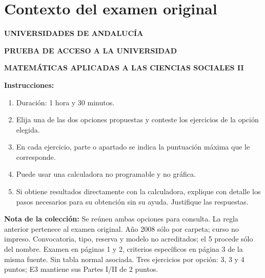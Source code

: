 \section*{Contexto del examen original}
\textbf{UNIVERSIDADES DE ANDALUCÍA}\par
\textbf{PRUEBA DE ACCESO A LA UNIVERSIDAD}\par
\textbf{MATEMÁTICAS APLICADAS A LAS CIENCIAS SOCIALES II}

\textbf{Instrucciones:}
\begin{enumerate}[label=\textbf{\alph*)}]
  \item Duración: 1 hora y 30 minutos.
  \item Elija una de las dos opciones propuestas y conteste los ejercicios de la opción elegida.
  \item En cada ejercicio, parte o apartado se indica la puntuación máxima que le corresponde.
  \item Puede usar una calculadora no programable y no gráfica.
  \item Si obtiene resultados directamente con la calculadora, explique con detalle los pasos necesarios para su obtención sin su ayuda. Justifique las respuestas.
\end{enumerate}
\noindent\textbf{Nota de la colección:} Se reúnen ambas opciones para consulta. La regla anterior pertenece al examen original. Año 2008 sólo por carpeta; curso no impreso. Convocatoria, tipo, reserva y modelo no acreditados; el 5 procede sólo del nombre. Examen en páginas 1 y 2, criterios específicos en página 3 de la misma fuente. Sin tabla normal asociada. Tres ejercicios por opción: 3, 3 y 4 puntos; E3 mantiene sus Partes I/II de 2 puntos.
\par\medskip

